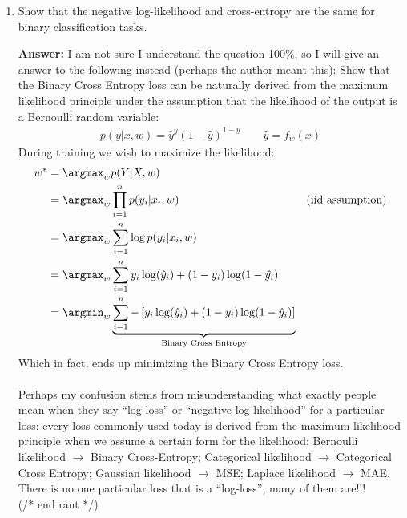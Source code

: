\documentclass{article}
\newenvironment{QandA}{\begin{enumerate}[label=\arabic*.]}{\end{enumerate}}
\newenvironment{answer}{\par\normalfont \textbf{Answer:}}{}
\newcommand{\g}{\vert}
\begin{document}
\begin{QandA}
    \item Show that the negative log-likelihood and cross-entropy are the same for binary classification tasks.
    \begin{answer}
        I am not sure I understand the question 100\%, so I will give an answer to the following instead (perhaps the author meant this): Show that the Binary Cross Entropy loss can be naturally derived from the maximum likelihood principle under the assumption that the likelihood of the output is a Bernoulli random variable:
        \begin{align*}
            p(y \g x, w) = \hat{y}^y (1-\hat{y})^{1-y} \quad\quad \hat{y} = f_w(x)
        \end{align*}
        During training we wish to maximize the likelihood:
        \begin{align*}
            w^* &= \argmax_{w} p(Y \g X, w) \\
            &= \argmax_{w} \prod_{i=1}^n p(y_i \g x_i, w) &\text{(iid assumption)} \\
            &= \argmax_{w} \sum_{i=1}^n \log p(y_i \g x_i, w) \\
            &= \argmax_{w} \sum_{i=1}^n y_i\log(\hat{y}_i) + (1-y_i)\log(1-\hat{y_i}) \\
            &= \argmin_{w} \underbrace{\sum_{i=1}^n - \left[ y_i\log(\hat{y}_i) + (1-y_i)\log(1-\hat{y}_i)\right]}_{\text{Binary Cross Entropy}}
        \end{align*}
        Which in fact, ends up minimizing the Binary Cross Entropy loss. \\\\
        Perhaps my confusion stems from misunderstanding what exactly people mean when they say ``log-loss'' or ``negative log-likelihood'' for a particular loss: every loss commonly used today is derived from the maximum likelihood principle when we assume a certain form for the likelihood: Bernoulli likelihood $\rightarrow$ Binary Cross-Entropy; Categorical likelihood $\rightarrow$ Categorical Cross Entropy; Gaussian likelihood $\rightarrow$ MSE; Laplace likelihood $\rightarrow$ MAE. There is no one particular loss that is a ``log-loss'', many of them are!!!\\
        (/* end rant */)
    \end{answer}


\end{QandA}
\end{document}
